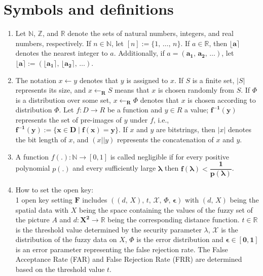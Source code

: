 \documentclass[graybox]{svmult}
\begin{document}
\section{Symbols and definitions}
\begin{enumerate}[label=(\roman*), itemsep=1em]
    \item Let \( \mathbb{N} \), \( \mathbb{Z} \), and \( \mathbb{R} \) denote the sets of natural numbers, integers, and real numbers, respectively. If \( n \in \mathbb{N} \), let \( [n] := \{1,\, \ldots,\, n\} \). If \( a \in \mathbb{R} \), then \( \boldsymbol{\lfloor a \rceil} \) denotes the nearest integer to \( a \). Additionally, if \( a = \boldsymbol{(a_1,\, a_2,\, \ldots)} \), let \( \boldsymbol{\lfloor a \rceil := (\lfloor a_1 \rceil,\, \lfloor a_2 \rceil,\, \ldots)} \).
    \item The notation \( x \leftarrow y \) denotes that \( y \) is assigned to \( x \). If \( S \) is a finite set, \( |S| \) represents its size, and \( x \leftarrow_{\mathbf{R}}   S \) means that \( x \) is chosen randomly from \( S \). If \( \varPhi \) is a distribution over some set, \( x \leftarrow_{\mathbf{R}} \varPhi \) denotes that \( x \) is chosen according to distribution \( \varPhi \). Let \( f: D \rightarrow R \) be a function and \( y \in R \) a value; \( \boldsymbol{ f^{-1}(y) } \) represents the set of pre-images of \( y \) under \( f \), i.e., \( \boldsymbol{ f^{-1}(y) := \{x \in D \mid f(x) = y\} } \). If \( x \) and \( y \) are bitstrings, then \( |x| \) denotes the bit length of \( x \), and \( (x || y) \) represents the concatenation of \( x \) and \( y \).
    \item A function \( f(.): \mathbb{N} \rightarrow [0, 1] \) is called negligible if for every positive polynomial \( p(.) \) and every sufficiently large \( \mathbf{\lambda} \) then \(  \mathbf{f(\lambda) < \dfrac{1}{p(\lambda)}} \).
    \item How to set the open key: \\
          1 open key setting \( \mathbf{F} \) includes \( ((d, \, X), \, t, \, \mathcal{X}  ,\, \varPhi,\, \mathbf{\epsilon} ) \) with \( (d, \, X) \) being the spatial data with \( X \) being the space containing the values of the fuzzy set of the picture \( A \) and \( d :\mathbf{X^2} \to \mathbb{R} \) being the corresponding distance function. \( t \in \mathbb{R} \) is the threshold value determined by the security parameter \( \lambda \), \( \mathcal{X} \) is the distribution of the fuzzy data on \( X \), \( \varPhi \) is the error distribution and \( \mathbf{ \epsilon \in [0,1] } \) is an error parameter representing the false rejection rate. The False Acceptance Rate (FAR) and False Rejection Rate (FRR) are determined based on the threshold value \( t \).\\[6pt]

\end{enumerate}
\end{document}
